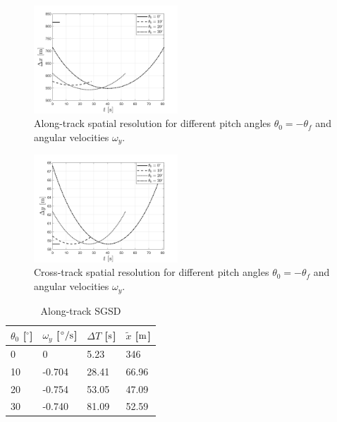 \begin{figure}[htbp]
  \centering
      \includegraphics[width=0.48\textwidth]{figs/Delta_x.png}
  \caption{Along-track spatial resolution for different pitch angles $\theta_0=-\theta_f$ and angular velocities $\omega_{y}$.}
	\label{fig:spatial_time}
\end{figure}
\begin{figure}[htbp]
  \centering
      \includegraphics[width=0.48\textwidth]{figs/Delta_y.png}
  \caption{Cross-track spatial resolution for different pitch angles $\theta_0=-\theta_f$ and angular velocities $\omega_{y}$.}
	\label{fig:cross_spatial_time}
\end{figure}
\begin{table}[htbp]
	\caption{Along-track SGSD}
	\label{tab:SGSD}
	\centering
			\begin{tabular}{l l l| l}
				\hline
				$\theta_0$ [$^{\circ}$] & $\omega_y$ [$^{\circ}\rm{/s}$] & $\Delta T$ [$\rm{s}$]&  $\tilde{x}$ [$\rm{m}$] \\
				\hline
				0 & 0 & 5.23 & 346  \\
				10 & -0.704 & 28.41 & 66.96 \\
				20 & -0.754 & 53.05 & 47.09 \\
				30 & -0.740 & 81.09 & 52.59 \\
				\hline
				\end{tabular}
\end{table}
